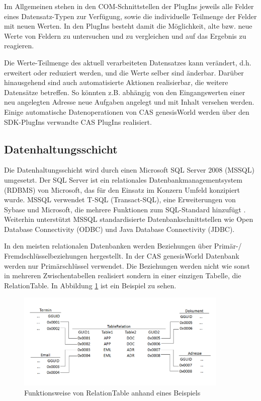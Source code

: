 Im Allgemeinen stehen in den COM-Schnittstellen der PlugIns jeweils alle Felder eines Datensatz-Typen zur Verfügung, sowie die individuelle Teilmenge der Felder mit neuen Werten. In den PlugIns besteht damit die Möglichkeit, alte bzw. neue Werte von Feldern zu untersuchen und zu vergleichen und auf das Ergebnis zu reagieren.

Die Werte-Teilmenge des aktuell verarbeiteten Datensatzes kann verändert, d.h. erweitert oder reduziert werden, und die Werte selber sind änderbar. Darüber hinausgehend sind auch automatisierte Aktionen realisierbar, die weitere Datensätze betreffen. So könnten z.B. abhängig von den Eingangswerten einer neu angelegten Adresse neue Aufgaben angelegt und mit Inhalt versehen werden. Einige automatische Datenoperationen von CAS genesisWorld werden über den SDK-PlugIns verwandte CAS PlugIns realisiert.

\subsection{Datenhaltungsschicht}
\label{ch:Systemanalyse:sec:genesisWorld:subsec:db}

Die Datenhaltungsschicht wird durch einen Microsoft SQL Server 2008 (MSSQL) umgesetzt. Der SQL Server ist ein relationales Datenbankmanagementsystem (RDBMS) von Microsoft, das für den Einsatz im Konzern Umfeld konzipiert wurde. MSSQL verwendet T-SQL (Transact-SQL), eine Erweiterungen von Sybase und Microsoft, die mehrere Funktionen zum SQL-Standard hinzufügt \cite{tech2013}. Weiterhin unterstützt MSSQL standardisierte Datenbankschnittstellen wie Open Database Connectivity (ODBC) und Java Database Connectivity (JDBC).
  
In den meisten relationalen Datenbanken werden Beziehungen über Primär-/ Fremdschlüsselbeziehungen hergestellt. In der CAS genesisWorld Datenbank werden nur Primärschlüssel verwendet. Die Beziehungen werden nicht wie sonst in mehreren Zwischentabellen realisiert sondern in einer einzigen Tabelle, die RelationTable. In Abbildung \ref{gw_2} ist ein Beispiel zu sehen.

\begin{figure}[ht]
	\centering
  \includegraphics[width=0.9\textwidth, width=0.9\textwidth]{pics/gW_tablerealtion.png}
	\caption{Funktionsweise von RelationTable anhand eines Beispiels}
	\label{gw_2}
\end{figure}

